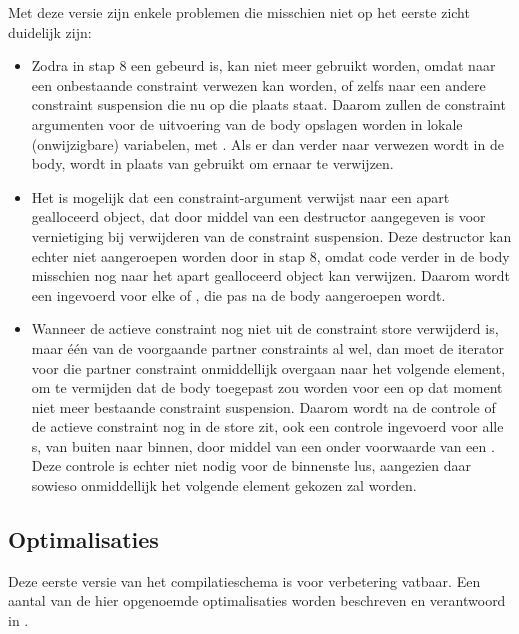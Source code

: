 Met deze versie zijn enkele problemen die misschien niet op het eerste zicht duidelijk zijn: \begin{itemize}
  \item Zodra in stap 8 een  gebeurd is, kan  niet meer gebruikt worden, omdat naar een onbestaande constraint verwezen kan worden, of zelfs naar een andere constraint suspension die nu op die plaats staat. Daarom zullen de constraint argumenten voor de uitvoering van de body opslagen worden in lokale (onwijzigbare) variabelen, met . Als er dan verder naar verwezen wordt in de body, wordt  in plaats van  gebruikt om ernaar te verwijzen.
  \item Het is mogelijk dat een constraint-argument verwijst naar een apart gealloceerd object, dat door middel van een destructor aangegeven is voor vernietiging bij verwijderen van de constraint suspension. Deze destructor kan echter niet aangeroepen worden door  in stap 8, omdat code verder in de body misschien nog naar het apart gealloceerd object kan verwijzen. Daarom wordt een  ingevoerd voor elke  of , die pas na de body aangeroepen wordt.
  \item Wanneer de actieve constraint nog niet uit de constraint store verwijderd is, maar \'e\'en van de voorgaande partner constraints al wel, dan moet de iterator voor die partner constraint onmiddellijk overgaan naar het volgende element, om te vermijden dat de body toegepast zou worden voor een op dat moment niet meer bestaande constraint suspension. Daarom wordt na de controle of de actieve constraint nog in de store zit, ook een controle ingevoerd voor alle s, van buiten naar binnen, door middel van een  onder voorwaarde van een . Deze controle is echter niet nodig voor de binnenste lus, aangezien daar sowieso onmiddellijk het volgende element gekozen zal worden.
\end{itemize}

\subsection{Optimalisaties} \label{sec:optim}

Deze eerste versie van het compilatieschema is voor verbetering vatbaar. Een aantal van de hier opgenoemde optimalisaties worden beschreven en verantwoord in \cite{tomsphdthesis}. 

